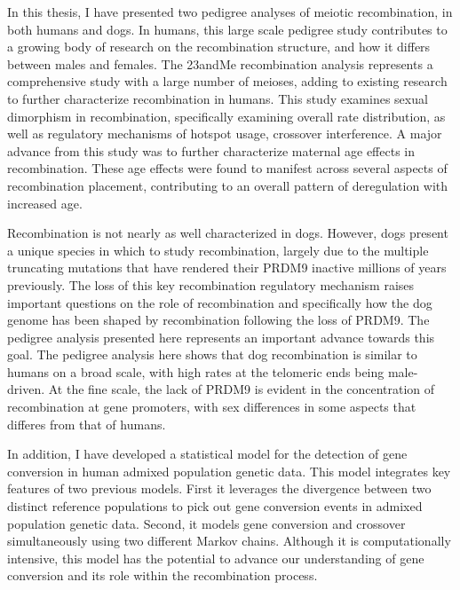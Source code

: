 



In this thesis, I have presented two pedigree analyses of meiotic recombination, in both humans and dogs.
In humans, this large scale pedigree study contributes to a growing body of research on the recombination structure, and how it differs between males and females.
The 23andMe recombination analysis represents a comprehensive study with a large number of meioses, adding to existing research to further characterize recombination in humans.
This study examines sexual dimorphism in recombination, specifically examining overall rate distribution, as well as regulatory mechanisms of hotspot usage, crossover interference.
A major advance from this study was to further characterize maternal age effects in recombination.
These age effects were found to manifest across several aspects of recombination placement, contributing to an overall pattern of deregulation with increased age.

Recombination is not nearly as well characterized in dogs.
However, dogs present a unique species in which to study recombination, largely due to the multiple truncating mutations that have rendered their PRDM9 inactive millions of years previously.
The loss of this key recombination regulatory mechanism raises important questions on the role of recombination and specifically how the dog genome has been shaped by recombination following the loss of PRDM9.
The pedigree analysis presented here represents an important advance towards this goal.
The pedigree analysis here shows that dog recombination is similar to humans on a broad scale, with high rates at the telomeric ends being male-driven.
At the fine scale, the lack of PRDM9 is evident in the concentration of recombination at gene promoters, with sex differences in some aspects that differes from that of humans.

In addition, I have developed a statistical model for the detection of gene conversion in human admixed population genetic data.
This model integrates key features of two previous models.
First it leverages the divergence between two distinct reference populations to pick out gene conversion events in admixed population genetic data.
Second, it models gene conversion and crossover simultaneously using two different Markov chains.
Although it is computationally intensive, this model has the potential to advance our understanding of gene conversion and its role within the recombination process.

